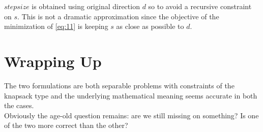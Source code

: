 \documentclass[12pt]{article}
\begin{document}
	$stepsize$ is obtained using original direction $d$ so to avoid a recursive constraint on $s$. This is not a dramatic approximation since the objective of the minimization of \eqref{eq:11} is keeping $s$ as close as possible to $d$.

	\pagebreak
	\section{Wrapping Up}
	The two formulations are both separable problems with constraints of the knapsack type and the underlying mathematical meaning seems accurate in both the cases. \\Obviously the age-old question remains: are we still missing on something? Is one of the two more correct than the other?
\end{document}
